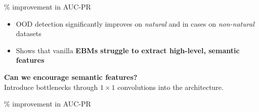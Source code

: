 \documentclass[landscape,a0paper,fontscale=0.30]{baposter}
\begin{document}
\begin{poster}
{\begin{minipage}[t]{.48\linewidth}
\begin{center}
        \% improvement in AUC-PR
        \end{center}
        \begin{itemize}
            \item OOD detection significantly improves on \textit{natural} and in cases on \textit{non-natural} datasets
            \item Shows that vanilla \textbf{EBMs struggle to extract high-level, semantic features}
        \end{itemize}

        \vspace{1em}

        \textbf{\color{blue}Can we encourage semantic features?} \\
        Introduce bottlenecks through \(1 \times 1\) convolutions into the architecture.
        \begin{center}
        \resizebox{0.5\textwidth}{!}{
        
        }
        \vspace{0.5em}

        \% improvement in AUC-PR
        \end{center}
        \vspace{0.45em}


\end{minipage}}
\end{poster}
\end{document}
